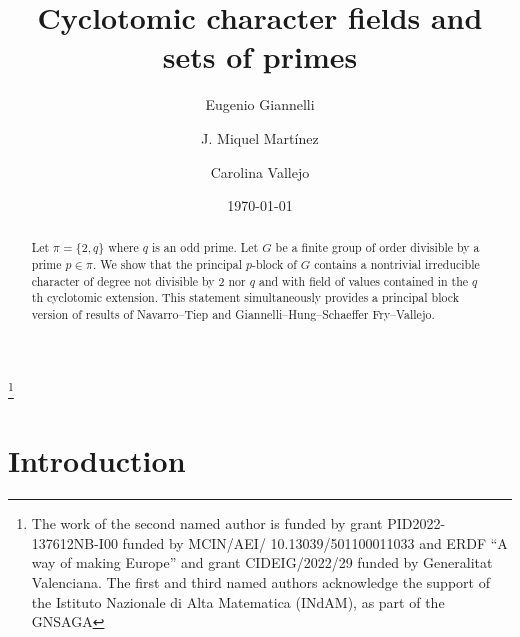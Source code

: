 \documentclass[a4paper,12pt,leqno]{amsart}
\newcommand{\6}{^}
\theoremstyle{definition}
\theoremstyle{definition}
\theoremstyle{definition}
\theoremstyle{definition}
\theoremstyle{definition}
\begin{document}


\thanks{The work of the second named author is funded by grant
PID2022-137612NB-I00 funded by MCIN/AEI/ 10.13039/501100011033 and ERDF ``A way of making Europe''
and grant CIDEIG/2022/29 funded by Generalitat Valenciana. The first and third named authors acknowledge the support of the
 Istituto Nazionale di Alta Matematica (INdAM), as part of the GNSAGA}


\author{Eugenio Giannelli}
\address[E. Giannelli]{Dipartimento di Matematica e Informatica,
V. Morgagni 67, Firenze, Italy.}

\author{J. Miquel Mart\'inez}
\address[J. M. Mart\'inez]{Departament de Matem\`atiques, Universitat
  de Val\`encia, 46100 Burjassot, Val\`encia.}

\author{Carolina Vallejo}
\address[C. Vallejo]{Dipartimento di Matematica e Informatica,
V. Morgagni 67, Firenze, Italy.}



\title[Cyclotomic character fields and sets of primes]{Cyclotomic character fields and sets of primes}


\date{\today}

\begin{abstract} Let $\pi=\{ 2, q \}$ where $q$ is an odd prime.
Let $G$ be a finite group of order divisible by a prime $p \in \pi$. We show that the principal $p$-block of $G$ contains a nontrivial irreducible character
of degree not divisible by $2$ nor $q$ and with field of values contained in the $q$th cyclotomic extension. 
This statement simultaneously provides a principal block version of results of Navarro--Tiep and Giannelli--Hung--Schaeffer Fry--Vallejo.
 \end{abstract}


\maketitle


\section*{Introduction}  
\end{document}
